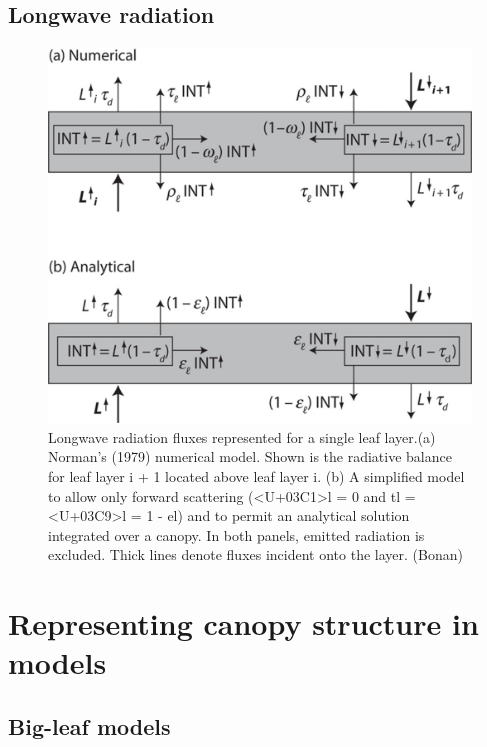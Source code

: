 \documentclass[
  oneside]{book}
\begin{document}
\hypertarget{longwave-radiation}{%
\subsection{Longwave radiation}\label{longwave-radiation}}

\begin{figure}

{\centering \includegraphics[width=0.8\linewidth]{figures/chap3/f322_LW} 

}

\caption{Longwave radiation fluxes represented for a single leaf layer.(a) Norman’s (1979) numerical model. Shown is the radiative balance for leaf layer i + 1 located above leaf layer i. (b) A simplified model to allow only forward scattering (<U+03C1>l = 0 and tl = <U+03C9>l = 1 - el) and to permit an analytical solution integrated over a canopy. In both panels, emitted radiation is excluded. Thick lines denote fluxes incident onto the layer. (Bonan)}\label{fig:f322}
\end{figure}

\hypertarget{representing-canopy-structure-in-models}{%
\section{Representing canopy structure in models}\label{representing-canopy-structure-in-models}}

\hypertarget{big-leaf-models}{%
\subsection{Big-leaf models}\label{big-leaf-models}}
\end{document}
